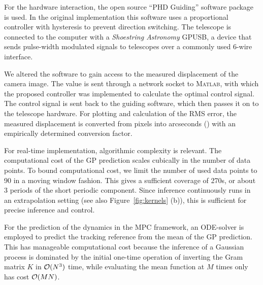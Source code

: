For the hardware interaction, the open source ``PHD Guiding'' software package
is used. In the original implementation this software uses a proportional
controller with hysteresis to prevent direction switching. The telescope is
connected to the computer with a \emph{Shoestring Astronomy} GPUSB, a
device that sends pulse-width modulated signals to telescopes over a commonly
used 6-wire interface.

We altered the software to gain access to the measured displacement of the
camera image. The value is sent through a network socket to \textsc{Matlab},
with which the proposed controller was implemented to calculate the optimal
control signal. The control signal is sent back to the guiding software, which
%
%
then passes it on to the telescope hardware. For plotting and
calculation of the RMS error, the measured displacement is converted from
pixels into arcseconds (\as) with an empirically determined conversion
factor\footnotemark.

For real-time implementation, algorithmic complexity is relevant. The
computational cost of the GP prediction scales cubically in the number of
data points. To bound computational cost, we limit the number of used data
points to 90 in a moving window fashion. This gives a sufficient coverage of
270\unit{s}, or about 3 periods of the short periodic component. Since
inference continuously runs in an extrapolation setting (see also
Figure~\ref{fig:kernels} (b)), this is sufficient for precise inference and
control.

For the prediction of the dynamics in the MPC framework, an ODE-solver is
employed to predict the tracking reference from the mean of the GP prediction.
This has manageable computational cost because the inference of a Gaussian
process is dominated by the initial one-time operation of inverting the Gram
matrix $K$ in $\mathcal{O}(N^3)$ time, while evaluating the mean function at
$M$ times only has cost $\mathcal{O}(MN)$.

